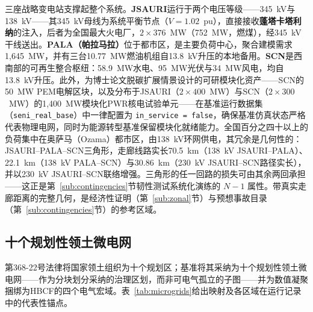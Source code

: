 三座战略变电站支撑起整个系统。\textbf{JSAURI}运行于两个电压等级——345~kV与138~kV——其345~kV母线为系统平衡节点（$V = 1.02$~pu），直接接收\textbf{蓬塔卡塔利纳}的注入，后者为全国最大火电厂，$2 \times 376$~MW（752~MW，燃煤），经345~kV干线送出。\textbf{PALA（帕拉马拉）}位于都市区，是主要负荷中心，聚合建模需求1,645~MW，并有三台10.77~MW燃油机组自13.8~kV升压的本地备用。\textbf{SCN}是西南部的可再生整合枢纽：58.9~MW水电、95~MW光伏与34~MW风电，均自13.8~kV升压。此外，为博士论文脱碳扩展情景设计的可研模块化资产——SCN的50~MW PEM电解区块，以及分布于JSAURI（$2 \times 400$~MW）与SCN（$2 \times 300$~MW）的1,400~MW模块化PWR核电试验单元——在基准运行数据集（\texttt{seni\_real\_base}）中一律配置为 \texttt{in\_service = false}，确保基准仿真状态严格代表物理电网，同时为能源转型基准保留模块化就绪能力。全国百分之四十以上的负荷集中在奥萨马（Ozama）都市区，由138~kV环网供电，其冗余是几何性的：JSAURI--PALA--SCN三角形，走廊线路实长70.5~km（138~kV JSAURI--PALA）、22.1~km（138~kV PALA--SCN）与30.86~km（230~kV JSAURI--SCN路径实长），并以230~kV JSAURI--SCN联络增强。三角形的任一回路的损失可由其余两回承担——这正是第~\ref{sub:contingencies}节韧性测试系统化演练的 $N-1$ 属性。带真实走廊距离的完整几何，是经济性证明（第~\ref{sub:zonal}节）与预想事故目录（第~\ref{sub:contingencies}节）的参考区域。

\subsection{十个规划性领土微电网}
\label{sub:microgrids}

第368-22号法律将国家领土组织为十个规划区；基准将其采纳为十个规划性领土微电网——作为分块划分采纳的治理区划，而非可电气孤立的子图——并为数值凝聚捆绑为HBCF的四个电气宏域。表~\ref{tab:microgrids}给出映射及各区域在运行记录中的代表性锚点。

